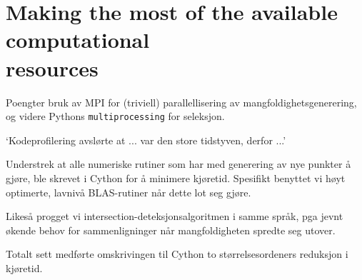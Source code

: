 \section[Making the most of the available computational resources]
{Making the most of the available computational \\\phantom{3.12} resources}
\label{sec:making_the_most_of_the_available_computational_resources}

\begin{framed}
    Poengter bruk av MPI for (triviell) parallellisering av mangfoldighetsgenerering,
    og videre Pythons \texttt{multiprocessing} for seleksjon.

    `Kodeprofilering avslørte at ... var den store tidstyven, derfor ...'

    Understrek at alle numeriske rutiner som har med generering av nye punkter å
    gjøre, ble skrevet i Cython for å minimere kjøretid. Spesifikt
    benyttet vi høyt optimerte, lavnivå BLAS-rutiner når dette lot seg gjøre.

    Likeså progget vi intersection-deteksjonsalgoritmen i samme språk,
    pga jevnt økende behov for sammenligninger når mangfoldigheten spredte seg
    utover.

    Totalt sett medførte omskrivingen til Cython to størrelsesordeners reduksjon
    i kjøretid.
\end{framed}
